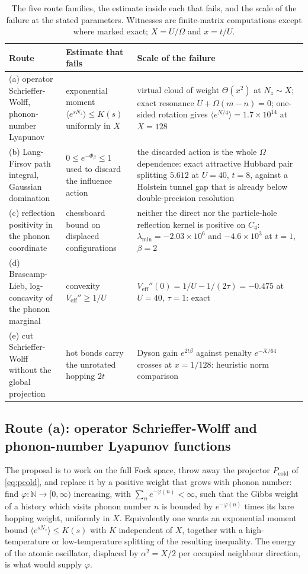\documentclass[11pt]{article}
\theoremstyle{definition}
\theoremstyle{remark}
\newcommand{\N}{\mathbb{N}}
\newcommand{\cold}{\mathrm{cold}}
\begin{document}
\begin{table}[t]
\centering
\small
\caption{The five route families, the estimate inside each that fails, and the
scale of the failure at the stated parameters. Witnesses are finite-matrix
computations except where marked exact; $X=U/\Omega$ and $x=t/U$.}
\label{tab:routes}
\begin{tabular}{@{}>{\raggedright\arraybackslash}p{2.5cm}>{\raggedright\arraybackslash}p{5.0cm}>{\raggedright\arraybackslash}p{7.0cm}@{}}
\toprule
Route & Estimate that fails & Scale of the failure \\
\midrule
(a) operator
Schrieffer-Wolff, phonon-number Lyapunov & exponential moment
$\langle e^{sN_{z}}\rangle\le K(s)$ uniformly in $X$ &
virtual cloud of weight $\Theta(x^{2})$ at $N_{z}\sim X$; exact resonance
$U+\Omega(m-n)=0$; one-sided rotation gives
$\langle e^{N/4}\rangle=1.7\times10^{14}$ at $X=128$ \\
(b) Lang-Firsov path integral, Gaussian domination & $0\le e^{-\Phi_{\beta}}\le1$
used to discard the influence action &
the discarded action is the whole $\Omega$ dependence: exact attractive Hubbard
pair splitting $5.612$ at $U=40$, $t=8$, against a Holstein tunnel gap that is
already below double-precision resolution \\
(c) reflection positivity in the
phonon coordinate & chessboard bound on displaced configurations &
neither the direct nor the particle-hole reflection kernel is positive on
$C_{4}$: $\lambda_{\min}=-2.03\times10^{6}$ and $-4.6\times10^{3}$ at $t=1$,
$\beta=2$ \\
(d) Brascamp-Lieb, log-concavity of the phonon marginal & convexity
$V_{\mathrm{eff}}''\ge1/U$ &
$V_{\mathrm{eff}}''(0)=1/U-1/(2\tau)=-0.475$ at $U=40$, $\tau=1$: exact \\
(e) cut Schrieffer-Wolff without the global projection & hot bonds carry the
unrotated hopping $2t$ &
Dyson gain $e^{2t\beta}$ against penalty $e^{-X/64}$ crosses at
$x=1/128$: heuristic norm comparison \\
\bottomrule
\end{tabular}
\end{table}

\subsection{Route (a): operator Schrieffer-Wolff and phonon-number Lyapunov
functions}\label{sub:routea}

The proposal is to work on the full Fock space, throw away the projector
$P_{\cold}$ of \eqref{eq:pcold}, and replace it by a positive weight that grows
with phonon number: find $\varphi:\N\to[0,\infty)$ increasing, with
$\sum_{n}e^{-\varphi(n)}<\infty$, such that the Gibbs weight of a history which
visits phonon number $n$ is bounded by $e^{-\varphi(n)}$ times its bare hopping
weight, uniformly in $X$. Equivalently one wants an exponential moment bound
$\langle e^{sN_{z}}\rangle\le K(s)$ with $K$ independent of $X$, together with a
high-temperature or low-temperature splitting of the resulting inequality. The
energy of the atomic oscillator, displaced by $\alpha^{2}=X/2$ per occupied
neighbour direction, is what would supply $\varphi$.
\end{document}
